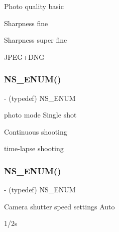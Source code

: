 Photo quality basic

Sharpness fine

Sharpness super fine

J\+P\+E\+G+\+D\+NG\mbox{\label{interface_p_v_camera_settings_def_a692068d660eba798e62875f3918206e2}} 
\subsubsection{\texorpdfstring{N\+S\+\_\+\+E\+N\+U\+M()}{NS\_ENUM()}\hspace{0.1cm}{\footnotesize\ttfamily [10/17]}}
{\footnotesize\ttfamily -\/ (typedef) N\+S\+\_\+\+E\+N\+UM \begin{DoxyParamCaption}\item[{(N\+S\+U\+Integer)}]{ }\item[{(P\+V\+Eye\+Camera\+Mode)}]{ }\end{DoxyParamCaption}}

photo mode Single shot

Continuous shooting

time-\/lapse shooting\mbox{\label{interface_p_v_camera_settings_def_ae4de3258d6b62f864f18cf868bc45885}} 
\subsubsection{\texorpdfstring{N\+S\+\_\+\+E\+N\+U\+M()}{NS\_ENUM()}\hspace{0.1cm}{\footnotesize\ttfamily [11/17]}}
{\footnotesize\ttfamily -\/ (typedef) N\+S\+\_\+\+E\+N\+UM \begin{DoxyParamCaption}\item[{(N\+S\+U\+Integer)}]{ }\item[{(P\+V\+Camera\+Photo\+Shutter\+Speed)}]{ }\end{DoxyParamCaption}}

Camera shutter speed settings Auto

1/2s

